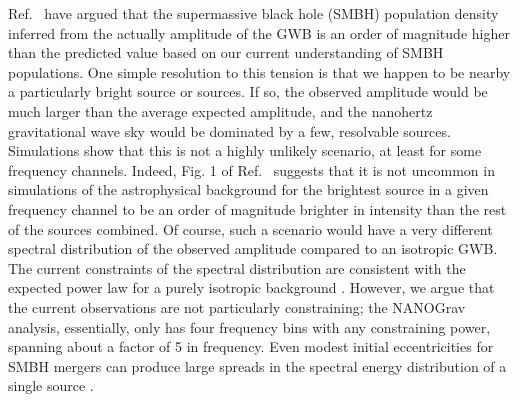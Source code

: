 \documentclass[%
 reprint,
nofootinbib,
 amsmath,amssymb,
 aps,
]{revtex4-2}
\begin{document}
Ref.~\cite{Sato-PolitoZaldarriagaQuataert2023} have argued that the supermassive black hole (SMBH) population density inferred from the actually amplitude of the GWB is an order of magnitude higher than the predicted value based on our current understanding of SMBH populations. One simple resolution to this tension is that we happen to be nearby a particularly bright source or sources. If so, the observed amplitude would be much larger than the average expected amplitude, and the nanohertz gravitational wave sky would be dominated by a few, resolvable sources. Simulations show that this is not a highly unlikely scenario, at least for some frequency channels. Indeed, Fig. 1 of Ref.~\cite{Kelley2018} suggests that it is not uncommon in simulations of the astrophysical background for the brightest source in a given frequency channel to be an order of magnitude brighter in intensity than the rest of the sources combined. Of course, such a scenario would have a very different spectral distribution of the observed amplitude compared to an isotropic GWB. The current constraints of the spectral distribution are consistent with the expected power law for a purely isotropic background \citep{NANOGravdetection}. However, we argue that the current observations are not particularly constraining; the NANOGrav analysis, essentially, only has four frequency bins with any constraining power, spanning about a factor of 5 in frequency. Even modest initial eccentricities for SMBH mergers can produce large spreads in the spectral energy distribution of a single source \citep{1963PhRv..131..435P, 2007PThPh.117..241E}. 
\end{document}
